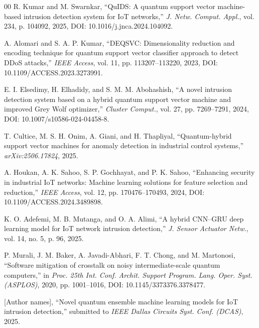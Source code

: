 \documentclass{ieeeaccess}
\begin{document}
\begin{thebibliography}{00}
 R. Kumar and M. Swarnkar, ``QuIDS: A quantum support vector machine-based intrusion detection system for IoT networks,'' \emph{J. Netw. Comput. Appl.}, vol. 234, p. 104092, 2025, DOI: 10.1016/j.jnca.2024.104092.

 A. Alomari and S. A. P. Kumar, ``DEQSVC: Dimensionality reduction and encoding technique for quantum support vector classifier approach to detect DDoS attacks,'' \emph{IEEE Access}, vol. 11, pp. 113207--113220, 2023, DOI: 10.1109/ACCESS.2023.3273991.

 E. I. Elsedimy, H. Elhadidy, and S. M. M. Abohashish, ``A novel intrusion detection system based on a hybrid quantum support vector machine and improved Grey Wolf optimizer,'' \emph{Cluster Comput.}, vol. 27, pp. 7269--7291, 2024, DOI: 10.1007/s10586-024-04458-8.

 T. Cultice, M. S. H. Onim, A. Giani, and H. Thapliyal, ``Quantum-hybrid support vector machines for anomaly detection in industrial control systems,'' \emph{arXiv:2506.17824}, 2025.

 A. Houkan, A. K. Sahoo, S. P. Gochhayat, and P. K. Sahoo, ``Enhancing security in industrial IoT networks: Machine learning solutions for feature selection and reduction,'' \emph{IEEE Access}, vol. 12, pp. 170476--170493, 2024, DOI: 10.1109/ACCESS.2024.3489898.

 K. O. Adefemi, M. B. Mutanga, and O. A. Alimi, ``A hybrid CNN--GRU deep learning model for IoT network intrusion detection,'' \emph{J. Sensor Actuator Netw.}, vol. 14, no. 5, p. 96, 2025.

 P. Murali, J. M. Baker, A. Javadi-Abhari, F. T. Chong, and M. Martonosi, ``Software mitigation of crosstalk on noisy intermediate-scale quantum computers,'' in \emph{Proc. 25th Int. Conf. Archit. Support Program. Lang. Oper. Syst. (ASPLOS)}, 2020, pp. 1001--1016, DOI: 10.1145/3373376.3378477.

 [Author names], ``Novel quantum ensemble machine learning models for IoT intrusion detection,'' submitted to \emph{IEEE Dallas Circuits Syst. Conf. (DCAS)}, 2025.

\end{thebibliography}


\EOD
\end{document}
